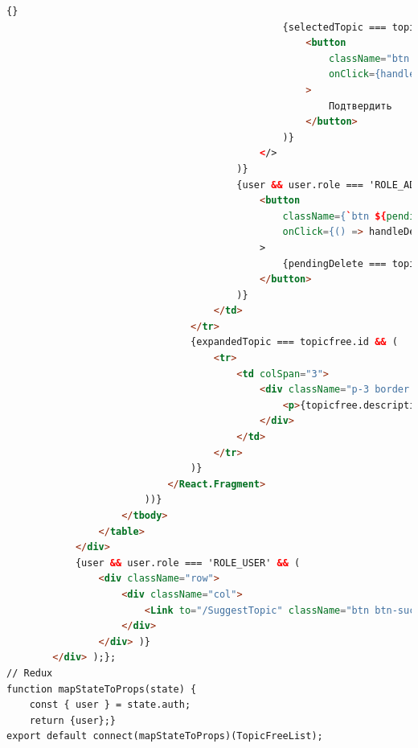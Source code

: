 \documentclass[14pt]{extarticle} %
\begin{document}
\begin{lstlisting}[language=html, caption={Клиентская часть TopicFreeList}]
                                                {}
                                                {selectedTopic === topicfree.id && (
                                                    <button 
                                                        className="btn btn-success ms-2"
                                                        onClick={handleConfirmTopic}
                                                    >
                                                        Подтвердить
                                                    </button>
                                                )}
                                            </>
                                        )}
                                        {user && user.role === 'ROLE_ADMIN' && (
                                            <button 
                                                className={`btn ${pendingDelete === topicfree.id ? 'btn-warning' : 'btn-danger'} ms-2`} 
                                                onClick={() => handleDeleteTopic(topicfree.id)}
                                            >
                                                {pendingDelete === topicfree.id ? 'Подтвердить удаление' : 'Удалить'}
                                            </button>
                                        )}
                                    </td>
                                </tr>
                                {expandedTopic === topicfree.id && (
                                    <tr>
                                        <td colSpan="3">
                                            <div className="p-3 border rounded">
                                                <p>{topicfree.description || 'Описание отсутствует.'}</p>
                                            </div>
                                        </td>
                                    </tr>
                                )}
                            </React.Fragment>
                        ))}
                    </tbody>
                </table>
            </div>
            {user && user.role === 'ROLE_USER' && (
                <div className="row">
                    <div className="col">
                        <Link to="/SuggestTopic" className="btn btn-success mb-3">Предложить свою тему</Link>
                    </div>
                </div> )}
        </div> );};
// Redux
function mapStateToProps(state) {
    const { user } = state.auth;
    return {user};}
export default connect(mapStateToProps)(TopicFreeList);
\end{lstlisting}
\end{document}
